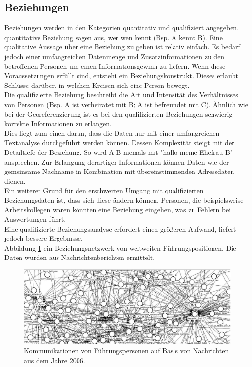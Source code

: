 \documentclass[twoside,a4paper]{article}
\begin{document}
\subsection{Beziehungen}
Beziehungen werden in den Kategorien quantitativ und qualifiziert angegeben.\\
quantitative Beziehung sagen aus, wer wen kennt (Bsp. A kennt B). Eine qualitative Aussage über eine Beziehung zu geben ist relativ einfach. Es bedarf jedoch einer umfangreichen Datenmenge und Zusatzinformationen zu den betroffenen Personen um einen Informationsgewinn zu liefern. Wenn diese Voraussetzungen erfüllt sind, entsteht ein Beziehungskonstrukt. Dieses erlaubt Schlüsse darüber, in welchen Kreisen sich eine Person bewegt.\\
Die qualifizierte Beziehung beschreibt die Art und Intensität des Verhältnisses von Personen (Bsp. A ist verheiratet mit B; A ist befreundet mit C). Ähnlich wie bei der Georeferenzierung ist es bei den qualifizierten Beziehungen schwierig korrekte Informationen zu erlangen. \\
Dies liegt zum einen daran, dass die Daten nur mit einer umfangreichen Textanalyse durchgeführt werden können. Dessen Komplexität steigt mit der Detailtiefe der Beziehung. So wird A B niemals mit "hallo meine Ehefrau B" ansprechen. Zur Erlangung derartiger Informationen können Daten wie der gemeinsame Nachname in Kombination mit übereinstimmenden Adressdaten dienen.\\
Ein weiterer Grund für den erschwerten Umgang mit qualifizierten Beziehungsdaten ist, dass sich diese ändern können. Personen, die beispielsweise Arbeitskollegen waren könnten eine Beziehung eingehen, was zu Fehlern bei Auswertungen führt.\\
Eine qualifizierte Beziehungsanalyse erfordert einen größeren Aufwand, liefert jedoch bessere Ergebnisse.\\
Abbildung \ref{img:Beziehungen} ein Beziehungsnetzwerk von weltweiten Führungspositionen. Die Daten wurden aus Nachrichtenberichten ermittelt.

\begin{figure}[H]
  \centering
  	\includegraphics[width=83.5truemm]{img/Beziehungen}
  \caption{Kommunikationen von Führungspersonen auf Basis von Nachrichten aus dem Jahre 2006.\cite{challanges_in_osint}}
  \label{img:Beziehungen}
\end{figure}
\end{document}

